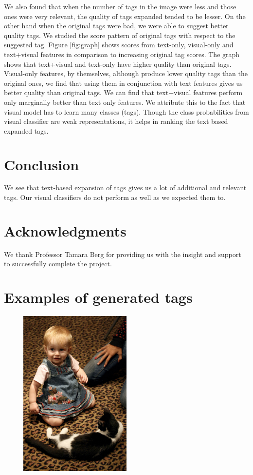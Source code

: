 \documentclass[12pt]{article}
\begin{document}
We also found that when the number of tags in the image were less and those ones were very relevant,
the quality of tags expanded tended to be lesser. On the other hand when the original tags were bad,
we were able to suggest better quality tags. We studied the score pattern of original tags with respect
to the suggested tag. Figure \ref{fig:graph} shows scores from text-only, visual-only and text+visual features in
comparison to increasing original tag scores. The graph shows that text+visual and text-only have
higher quality than original tags. Visual-only features, by themselves, although produce lower quality
tags than the original ones, we find that using them in conjunction with text features gives us better
quality than original tags. We can find that text+visual features perform only marginally better than
text only features. We attribute this to the fact that visual model has to learn many classes (tags).
Though the class probabilities from visual classifier are weak representations, it helps in ranking
the text based expanded tags.

\section{Conclusion}
We see that text-based expansion of tags gives us a lot of additional and relevant tags. Our visual classifiers
do not perform as well as we expected them to.

\section*{Acknowledgments}
We thank Professor Tamara Berg for providing us with the insight and support to successfully complete the project.






\newpage
\section{Examples of generated tags}
\begin{figure}[H]
\includegraphics[width=0.5\textwidth]{examples/cat1.jpg}
\end{figure}
\end{document}
